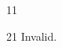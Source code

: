 \documentclass[paper=A4]{ropas-poster}
\begin{document}
\begin{postergrid}{1}{1}
\begin{posterblock}{2}{1}
Invalid.
\end{posterblock}
\end{postergrid}
\end{document}
